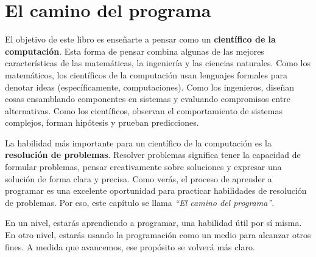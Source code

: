 \chapter{El camino del programa}

El objetivo de este libro es enseñarte a pensar como un \textbf{científico de la computación}. Esta forma de pensar combina algunas de las mejores características de las matemáticas, la ingeniería y las ciencias naturales. Como los matemáticos, los científicos de la computación usan lenguajes formales para denotar ideas (específicamente, computaciones). 
Como los ingenieros, diseñan cosas ensamblando componentes en sistemas y evaluando compromisos entre alternativas. Como los científicos, observan el comportamiento de sistemas complejos, forman hipótesis y prueban predicciones.

La habilidad más importante para un científico de la computación es la \textbf{resolución de problemas}. Resolver problemas significa tener la capacidad de formular problemas, pensar creativamente sobre soluciones y expresar una solución de forma clara y precisa. Como verás, el proceso de aprender a programar es una excelente oportunidad para practicar habilidades de resolución de problemas. Por eso, este capítulo se llama \emph{“El camino del programa”}.

En un nivel, estarás aprendiendo a programar, una habilidad útil por sí misma. En otro nivel, estarás usando la programación como un medio para alcanzar otros fines. A medida que avancemos, ese propósito se volverá más claro.


